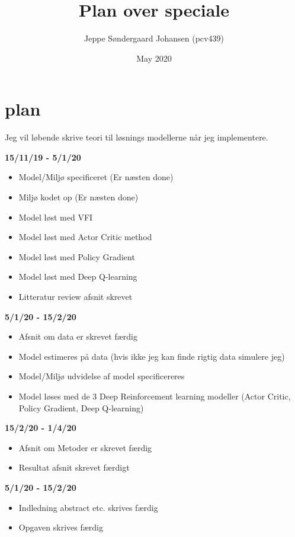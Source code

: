 \documentclass{article}
\title{Plan over speciale}
\author{Jeppe Søndergaard Johansen (pcv439)}
\date{May 2020}
\begin{document}
\maketitle

\section{plan}

Jeg vil løbende skrive teori til løsnings modellerne når jeg implementere.

\textbf{15/11/19 - 5/1/20}
\begin{itemize}
    \item Model/Miljø specificeret (Er næsten done)
    \item Miljø kodet op (Er næsten done)
    \item Model løst med VFI
    \item Model løst med Actor Critic method
    \item Model løst med Policy Gradient
    \item Model løst med Deep Q-learning
    \item Litteratur review afsnit skrevet
\end{itemize}

\textbf{5/1/20 - 15/2/20}
\begin{itemize}
    \item Afsnit om data er skrevet færdig
    \item Model estimeres på data (hvis ikke jeg kan finde rigtig data simulere jeg)
    \item Model/Miljø udvidelse af model specificereres
    \item Model løses med de 3 Deep Reinforcement learning modeller (Actor Critic, Policy Gradient, Deep Q-learning)
\end{itemize}

\textbf{15/2/20 - 1/4/20}
\begin{itemize}
    \item Afsnit om Metoder er skrevet færdig
    \item Resultat afsnit skrevet færdigt
\end{itemize}


\textbf{5/1/20 - 15/2/20}
\begin{itemize}
    \item Indledning abstract etc. skrives færdig
    \item Opgaven skrives færdig
\end{itemize}
\end{document}
